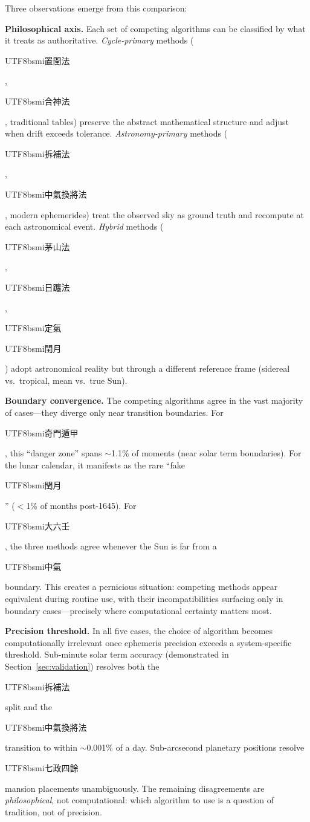 \documentclass[10pt,a4paper]{article}
\newcommand{\zh}[1]{\begin{CJK}{UTF8}{bsmi}#1\end{CJK}}
\begin{document}
Three observations emerge from this comparison:

\textbf{Philosophical axis.} Each set of competing algorithms can be
classified by what it treats as authoritative. \emph{Cycle-primary}
methods (\zh{置閏法}, \zh{合神法}, traditional tables) preserve the
abstract mathematical structure and adjust when drift exceeds tolerance.
\emph{Astronomy-primary} methods (\zh{拆補法}, \zh{中氣換將法}, modern
ephemerides) treat the observed sky as ground truth and recompute at each
astronomical event. \emph{Hybrid} methods (\zh{茅山法}, \zh{日躔法},
\zh{定氣} \zh{閏月}) adopt astronomical reality but through a different
reference frame (sidereal vs.\ tropical, mean vs.\ true Sun).

\textbf{Boundary convergence.} The competing algorithms agree in the vast
majority of cases---they diverge only near transition boundaries. For
\zh{奇門遁甲}, this ``danger zone'' spans $\sim$1.1\% of moments (near
solar term boundaries). For the lunar calendar, it manifests as the rare
``fake \zh{閏月}'' ($<$1\% of months post-1645). For \zh{大六壬}, the
three methods agree whenever the Sun is far from a \zh{中氣} boundary.
This creates a pernicious situation: competing methods appear equivalent
during routine use, with their incompatibilities surfacing only in
boundary cases---precisely where computational certainty matters most.

\textbf{Precision threshold.} In all five cases, the choice of algorithm
becomes computationally irrelevant once ephemeris precision exceeds a
system-specific threshold. Sub-minute solar term accuracy (demonstrated
in Section~\ref{sec:validation}) resolves both the \zh{拆補法} split and
the \zh{中氣換將法} transition to within $\sim$0.001\% of a day.
Sub-arcsecond planetary positions resolve \zh{七政四餘} mansion placements
unambiguously. The remaining disagreements are \emph{philosophical}, not
computational: which algorithm to use is a question of tradition, not of
precision.
\end{document}
